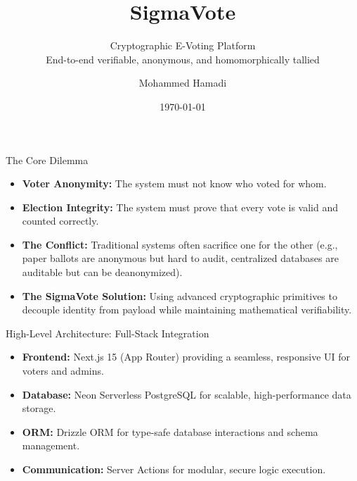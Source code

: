 \documentclass{beamer}
\title{SigmaVote}
\subtitle{Cryptographic E-Voting Platform \\ \small End-to-end verifiable, anonymous, and homomorphically tallied}
\author{Mohammed Hamadi}
\date{\today}
\institute{Computer Engineering}
\begin{document}
\maketitle

\begin{frame}{The Core Dilemma}
    \begin{itemize}
        \item \textbf{Voter Anonymity:} The system must not know who voted for whom.
        \item \textbf{Election Integrity:} The system must prove that every vote is valid and counted correctly.
        \item \textbf{The Conflict:} Traditional systems often sacrifice one for the other (e.g., paper ballots are anonymous but hard to audit, centralized databases are auditable but can be deanonymized).
        \item \textbf{The SigmaVote Solution:} Using advanced cryptographic primitives to decouple identity from payload while maintaining mathematical verifiability.
    \end{itemize}
\end{frame}

\begin{frame}{High-Level Architecture: Full-Stack Integration}
    \begin{itemize}
        \item \textbf{Frontend:} Next.js 15 (App Router) providing a seamless, responsive UI for voters and admins.
        \item \textbf{Database:} Neon Serverless PostgreSQL for scalable, high-performance data storage.
        \item \textbf{ORM:} Drizzle ORM for type-safe database interactions and schema management.
        \item \textbf{Communication:} Server Actions for modular, secure logic execution.
    \end{itemize}
\end{frame}
\end{document}
